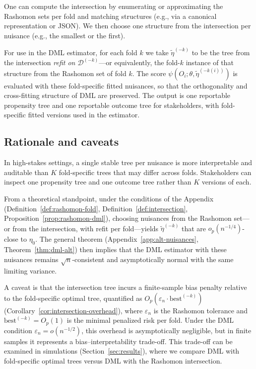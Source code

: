 \documentclass[12pt]{article}
\begin{document}
One can compute the intersection by enumerating or approximating the Rashomon sets per fold and matching structures (e.g., via a canonical representation or JSON). We then choose one structure from the intersection per nuisance (e.g., the smallest or the first).

For use in the DML estimator, for each fold $k$ we take $\tilde{\eta}^{(-k)}$ to be the tree from the intersection \emph{refit on $\mathcal{D}^{(-k)}$}---or equivalently, the fold-$k$ instance of that structure from the Rashomon set of fold $k$. The score $\psi(O_i; \theta, \tilde{\eta}^{(-k(i))})$ is evaluated with these fold-specific fitted nuisances, so that the orthogonality and cross-fitting structure of DML are preserved. The output is one reportable propensity tree and one reportable outcome tree for stakeholders, with fold-specific fitted versions used in the estimator.

\subsection{Rationale and caveats}

In high-stakes settings, a single stable tree per nuisance is more interpretable and auditable than $K$ fold-specific trees that may differ across folds. Stakeholders can inspect one propensity tree and one outcome tree rather than $K$ versions of each.

From a theoretical standpoint, under the conditions of the Appendix (Definition~\ref{def:rashomon-fold}, Definition~\ref{def:intersection}, Proposition~\ref{prop:rashomon-dml}), choosing nuisances from the Rashomon set---or from the intersection, with refit per fold---yields $\tilde{\eta}^{(-k)}$ that are $o_p(n^{-1/4})$-close to $\eta_0$. The general theorem (Appendix~\ref{app:alt-nuisances}, Theorem~\ref{thm:dml-alt}) then implies that the DML estimator with these nuisances remains $\sqrt{n}$-consistent and asymptotically normal with the same limiting variance.

A caveat is that the intersection tree incurs a finite-sample bias penalty relative to the fold-specific optimal tree, quantified as $O_p(\varepsilon_n \cdot \text{best}^{(-k)})$ (Corollary~\ref{cor:intersection-overhead}), where $\varepsilon_n$ is the Rashomon tolerance and $\text{best}^{(-k)} = O_p(1)$ is the minimal penalized risk per fold. Under the DML condition $\varepsilon_n = o(n^{-1/2})$, this overhead is asymptotically negligible, but in finite samples it represents a bias--interpretability trade-off. This trade-off can be examined in simulations (Section~\ref{sec:results}), where we compare DML with fold-specific optimal trees versus DML with the Rashomon intersection.
\end{document}
